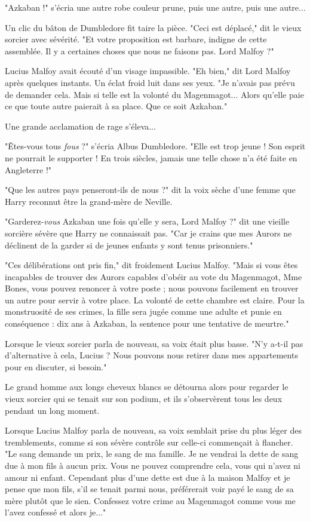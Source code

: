 "Azkaban !" s'écria une autre robe couleur prune, puis une autre, puis une autre...

Un clic du bâton de Dumbledore fit taire la pièce. "Ceci est déplacé," dit le vieux sorcier avec sévérité. "Et votre proposition est barbare, indigne de cette assemblée. Il y a certaines choses que nous ne faisons pas. Lord Malfoy ?"

Lucius Malfoy avait écouté d'un visage impassible. "Eh bien," dit Lord Malfoy après quelques instants. Un éclat froid luit dans ses yeux. "Je n'avais pas prévu de demander cela. Mais si telle est la volonté du Magenmagot... Alors qu'elle paie ce que toute autre paierait à sa place. Que ce soit Azkaban."

Une grande acclamation de rage s'éleva...

"Êtes-vous tous \emph{fous } ?" s'écria Albus Dumbledore. "Elle est trop jeune ! Son esprit ne pourrait le supporter ! En trois siècles, jamais une telle chose n'a été faite en Angleterre !"

"Que les autres pays penseront-ils de nous ?" dit la voix sèche d'une femme que Harry reconnut être la grand-mère de Neville.

"Garderez-\emph{vous}  Azkaban une fois qu'elle y sera, Lord Malfoy ?" dit une vieille sorcière sévère que Harry ne connaissait pas. "Car je crains que mes Aurors ne déclinent de la garder si de jeunes enfants y sont tenus prisonniers."

"Ces délibérations ont pris fin," dit froidement Lucius Malfoy. "Mais si vous êtes incapables de trouver des Aurors capables d'obéir au vote du Magenmagot, Mme Bones, vous pouvez renoncer à votre poste ; nous pouvons facilement en trouver un autre pour servir à votre place. La volonté de cette chambre est claire. Pour la monstruosité de ses crimes, la fille sera jugée comme une adulte et punie en conséquence : dix ans à Azkaban, la sentence pour une tentative de meurtre."

Lorsque le vieux sorcier parla de nouveau, sa voix était plus basse. "N'y a-t-il pas d'alternative à cela, Lucius ? Nous pouvons nous retirer dans mes appartements pour en discuter, si besoin."

Le grand homme aux longs cheveux blancs se détourna alors pour regarder le vieux sorcier qui se tenait sur son podium, et ils s'observèrent tous les deux pendant un long moment.

Lorsque Lucius Malfoy parla de nouveau, sa voix semblait prise du plus léger des tremblements, comme si son sévère contrôle sur celle-ci commençait à flancher. "Le sang demande un prix, le sang de ma famille. Je ne vendrai la dette de sang due à mon fils à aucun prix. Vous ne pouvez comprendre cela, vous qui n'avez ni amour ni enfant. Cependant plus d'une dette est due à la maison Malfoy et je pense que mon fils, s'il se tenait parmi nous, préférerait voir payé le sang de sa mère plutôt que le sien. Confessez votre crime au Magenmagot comme vous me l'avez confessé et alors je..."

